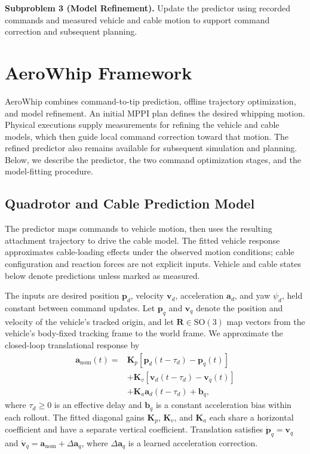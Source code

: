 \documentclass[letterpaper, 10 pt, conference]{ieeeconf}
\begin{document}
\noindent\textbf{Subproblem 3 (Model Refinement).}
Update the predictor using recorded commands and measured vehicle
and cable motion to support command correction and subsequent planning.



\section{AeroWhip Framework}
\label{sec:aerowhip_framework}

AeroWhip combines command-to-tip prediction, offline trajectory
optimization, and model refinement. An initial MPPI plan
defines the desired whipping motion. Physical executions supply
measurements for refining the vehicle and cable models, which then
guide local command correction toward that motion. The refined
predictor also remains available for subsequent simulation and
planning. Below, we describe the predictor, the two command
optimization stages, and the model-fitting procedure.

\subsection{Quadrotor and Cable Prediction Model}
\label{subsec:prediction_model}

The predictor maps commands to vehicle motion, then uses the
resulting attachment trajectory to drive the cable model.
The fitted vehicle response approximates cable-loading effects
under the observed motion conditions; cable configuration and reaction
forces are not explicit inputs. Vehicle and cable states below
denote predictions unless marked as measured.

The inputs are desired position $\mathbf p_d$, velocity
$\mathbf v_d$, acceleration $\mathbf a_d$, and yaw $\psi_d$,
held constant between command updates. Let $\mathbf p_q$
and $\mathbf v_q$ denote the position and velocity of the
vehicle's tracked origin, and let $\mathbf R\in\mathrm{SO}(3)$
map vectors from the vehicle's body-fixed tracking frame to
the world frame.
We approximate the closed-loop translational response by
\begin{equation}
\begin{aligned}
\mathbf a_{\mathrm{nom}}(t)
={}&\mathbf K_p[\mathbf p_d(t-\tau_d)-\mathbf p_q(t)]\\
&+\mathbf K_v[\mathbf v_d(t-\tau_d)-\mathbf v_q(t)]\\
&+\mathbf K_a\mathbf a_d(t-\tau_d)+\mathbf b_q,
\end{aligned}
\label{eq:quadrotor_response}
\end{equation}
where $\tau_d\geq0$ is an effective delay and $\mathbf b_q$
is a constant acceleration bias within each rollout.
The fitted diagonal gains $\mathbf K_p$, $\mathbf K_v$, and
$\mathbf K_a$ each share a horizontal coefficient and have a
separate vertical coefficient. Translation satisfies
$\dot{\mathbf p}_q=\mathbf v_q$ and
$\dot{\mathbf v}_q=\mathbf a_{\mathrm{nom}}+\Delta\mathbf a_q$,
where $\Delta\mathbf a_q$ is a learned acceleration correction.
\end{document}

